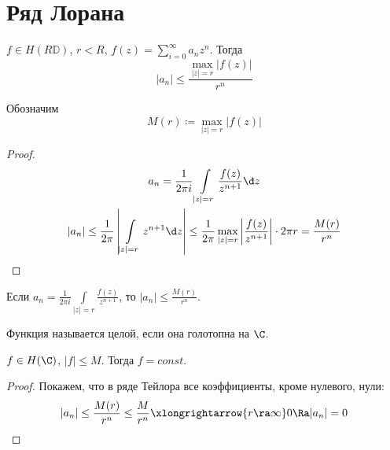 \section{Ряд Лорана}

\begin{theorem}
	$f \in H(R\mathbb D)$, $r < R$, $f(z) = \sum_{i=0}^\infty a_nz^n$.
	Тогда
	\[ |a_n| \le \frac{\max_{|z| = r} |f(z)|}{r^n} \]
\end{theorem}

Обозначим
\[ M(r) \coloneqq \max_{|z| = r} |f(z)| \]
\begin{proof}
	\begin{gather*}
		a_n = \frac1{2\pi i} \int\limits_{|z| = r} \frac{f(z)}{z^{n+1}} \d z \\
		|a_n|
		\le \frac1{2\pi} \left| \int\limits_{|z| = r}{z^{n+1}} \d z\right|
		\le \frac1{2\pi} \max_{|z| = r} \left| \frac{f(z)}{z^{n+1}}\right| \cdot 2\pi r = \frac{M(r)}{r^n}
	\end{gather*}
\end{proof}

\begin{Rem}
	Если $a_n = \frac1{2\pi i} \int\limits_{|z| = r} \frac{f(z)}{z^{n+1}}$, то $|a_n| \le \frac{M(r)}{r^n}$.
\end{Rem}

\begin{Def}
	Функция называется целой, если она голотопна на $\C$.
\end{Def}

\begin{theorem}[Лиувилля]
	$f \in H(\C)$, $|f| \le M$.
	Тогда $f = const$.
\end{theorem}
\begin{proof}
	Покажем, что в ряде Тейлора все коэффициенты, кроме нулевого, нули:
	\[ |a_n| \le \frac{M(r)}{r^n} \le \frac M{r^n} \xlongrightarrow{r \ra \infty} 0 \Ra |a_n| = 0 \]
\end{proof}

